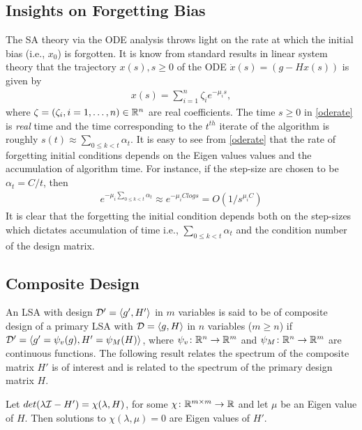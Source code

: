 \subsection{Insights on Forgetting Bias}
The SA theory via the ODE analysis throws light on the rate at which the initial bias (i.e., $x_0$) is forgotten. It is know from standard results in linear system theory that the trajectory $x(s),s\geq 0$ of the ODE $\dot{x}(s)=(g-Hx(s))$ is given by
\begin{align}\label{oderate}
x(s)=\sum_{i=1}^n \zeta_i e^{-\mu_i s}, 
\end{align}
where $\zeta=(\zeta_i,i=1,\ldots,n)\in \mathbb{R}^n$ are real coefficients. The time $s\geq 0$ in \eqref{oderate} is \emph{real} time and the time corresponding to the $t^{th}$ iterate of the algorithm is roughly $s(t)\approx\sum_{0\leq k<t}\alpha_t$. It is easy to see from \eqref{oderate} that the rate of forgetting initial conditions depends on the Eigen values values and the accumulation of algorithm time. For instance, if the step-size are chosen to be $\alpha_t=C/t$, then \begin{align}\label{biasforget}e^{-\mu_i\sum_{0\leq k<t}\alpha_t}\approx e^{-\mu_i Clog s}=O(1/s^{\mu_i C})\end{align}
It is clear that the forgetting the initial condition depends both on the step-sizes which dictates accumulation of time i.e., $\sum_{0\leq k<t}\alpha_t$ and the condition number of the design matrix. 
\subsection{Composite Design}
An LSA with design $\mathcal{D}'=\langle g',H' \rangle$ in $m$ variables is said to be of composite design of a primary LSA with $\mathcal{D}=\langle g,H\rangle$ in $n$ variables ($m\geq n$) if $\mathcal{D}'=\langle g'=\psi_v(g),H'=\psi_M(H)\rangle$, where $\psi_v\colon \mathbb{R}^n\rightarrow\mathbb{R}^m$ and $\psi_M\colon \mathbb{R}^n\rightarrow\mathbb{R}^m$ are continuous functions. The following result relates the spectrum of the composite matrix $H'$ is of interest and is related to the spectrum of the primary design matrix $H$.
\begin{lemma}
Let $det(\lambda \mathcal{I}-H')=\chi(\lambda,H)$, for some $\chi\colon \mathbb{R}^{m\times m}\rightarrow \mathbb{R}$ and  let $\mu$ be an Eigen value of $H$. Then solutions to $\chi(\lambda,\mu)=0$ are Eigen values of $H'$.
\end{lemma}
